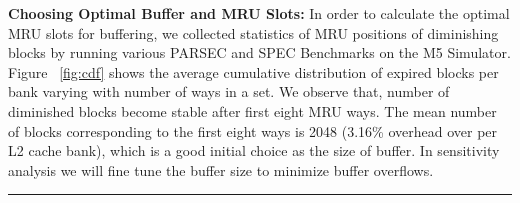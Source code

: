 \noindent\textbf{Choosing Optimal Buffer and MRU Slots:}
In order to calculate the optimal MRU slots for buffering, we collected statistics of MRU positions of diminishing blocks by running various PARSEC and SPEC Benchmarks on the M5 Simulator. 
Figure ~\ref{fig:cdf} shows the average cumulative distribution of expired blocks per bank varying with number of ways in a set. We observe that, number of diminished blocks become stable
after first eight MRU ways. The mean number of blocks corresponding to the first eight ways is 2048 (3.16\% overhead over per L2 cache bank),
which is a good initial choice as the size of buffer. In sensitivity analysis we will fine tune the buffer size to minimize buffer overflows. 


\begin{figure*} [t]
\centering
 \hrule
 \caption{\label{fig:cdf} \scriptsize \bf CDF}
\end{figure*}


